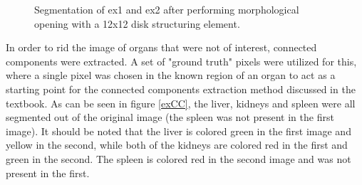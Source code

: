 \documentclass{article}[12 pt]
\begin{document}
\begin{figure}[H]
\captionsetup[subfloat]{labelformat=empty}
\centering
{} 
\caption{Segmentation of ex1 and ex2 after performing morphological opening with a 12x12 disk structuring element.}
\label{exOpened}
\end{figure}

\noindent
In order to rid the image of organs that were not of interest, connected components were extracted.  A set of "ground truth" pixels were utilized for this, where a single pixel was chosen in the known region of an organ to act as a starting point for the connected components extraction method discussed  in the textbook.  As can be seen in figure \ref{exCC}, the liver, kidneys and spleen were all segmented out of the original image (the spleen was not present in the first image).  It should be noted that the liver is colored green in the first image and yellow in the second, while both of the kidneys are colored red in the first and green in the second.  The spleen is colored red in the second image and was not present in the first.
\end{document}
